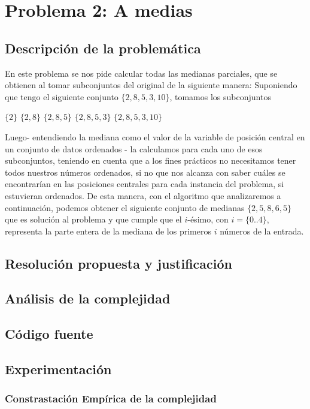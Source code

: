 \section{Problema 2: A medias}

\subsection{Descripción de la problemática}
En este problema se nos pide calcular todas las medianas parciales, que se obtienen al tomar subconjuntos del original de la siguiente manera:
Suponiendo que tengo el siguiente conjunto $\{2,8,5,3,10\}$, tomamos los subconjuntos
\begin{center}
	$\{2\}$ $\{2,8\}$ $\{2,8,5\}$ $\{2,8,5,3\}$ $\{2,8,5,3,10\}$
\end{center}
Luego- entendiendo la mediana como el valor de la variable de posición central en un conjunto de datos ordenados - la calculamos para cada uno de esos subconjuntos, teniendo en cuenta que a los fines prácticos no necesitamos tener todos nuestros números ordenados, si no que nos alcanza con saber cuáles se encontrarían en las posiciones centrales para cada instancia del problema, si estuvieran ordenados. De esta manera, con el algoritmo que analizaremos a continuación, podemos obtener el siguiente conjunto de medianas $\{2,5,8,6,5\}$ que es solución al problema y que cumple que el $i$-ésimo, con $i = \{0 $..$ 4\}$, representa la parte entera de la mediana de los primeros $i$ números de la entrada. 
\subsection{Resolución propuesta y justificación}

\subsection{Análisis de la complejidad}

\subsection{Código fuente}

\subsection{Experimentación}

\subsubsection{Constrastación Empírica de la complejidad}

